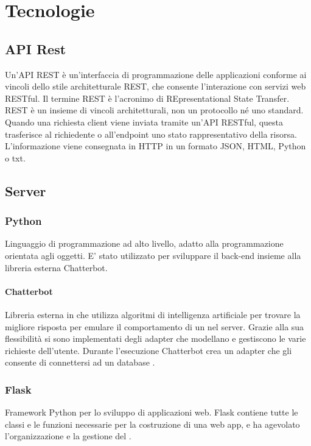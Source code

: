 \section{Tecnologie}
\subsection{API Rest}
Un'API REST è un'interfaccia di programmazione delle applicazioni conforme ai vincoli dello stile architetturale REST, che consente l'interazione con servizi web RESTful.\newline 
Il termine REST è l'acronimo di REpresentational State Transfer. REST è un insieme di vincoli architetturali, non un protocollo né uno standard.
Quando una richiesta client viene inviata tramite un'API RESTful, questa trasferisce al richiedente o all'endpoint uno stato rappresentativo della risorsa. L'informazione viene consegnata in HTTP in un formato JSON, HTML, Python o txt.

\subsection{Server}
\subsubsection{Python}
Linguaggio di programmazione ad alto livello, adatto alla programmazione orientata agli oggetti. E' stato utilizzato per sviluppare il back-end insieme alla libreria esterna Chatterbot.
\paragraph{Chatterbot}
Libreria esterna in  che utilizza algoritmi di intelligenza artificiale per trovare la migliore risposta per emulare il comportamento di un  nel server. \newline
Grazie alla sua flessibilità si sono implementati degli adapter che modellano e gestiscono le varie richieste dell'utente. \newline
Durante l'esecuzione Chatterbot crea un adapter che gli consente di connettersi ad un database .
\subsubsection{Flask}
Framework Python per lo sviluppo di applicazioni web. Flask contiene tutte le classi e le funzioni necessarie per la costruzione di una web app, e ha agevolato l'organizzazione e la gestione del .
